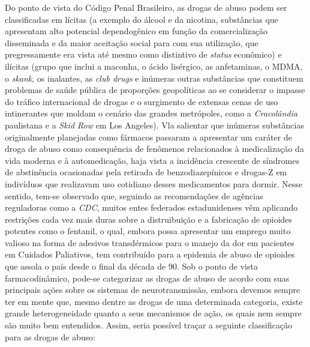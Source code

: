 \documentclass[
]{book}
\begin{document}
Do ponto de vista do Código Penal Brasileiro, as drogas de abuso podem ser classificadas em lícitas (a exemplo do álcool e da nicotina, substâncias que apresentam alto potencial dependogênico em função da comercialização disseminada e da maior aceitação social para com sua utilização, que pregressamente era vista até mesmo como distintivo de \emph{status} econômico) e ilícitas (grupo que inclui a maconha, o ácido lisérgico, as anfetaminas, o MDMA, o \emph{skank}, os inalantes, as \emph{club drugs} e inúmeras outras substâncias que constituem problemas de saúde pública de proporções geopolíticas ao se considerar o impasse do tráfico internacional de drogas e o surgimento de extensas cenas de uso intinerantes que moldam o cenário das grandes metrópoles, como a \emph{Cracolândia} paulistana e a \emph{Skid Row} em Los Angeles). Vla salientar que inúmeras substâncias originalmente planejadas como fármacos passaram a apresentar um caráter de droga de abuso como consequência de fenômenos relacionados à medicalização da vida moderna e à automedicação, haja vista a incidência crescente de síndromes de abstinência ocasionadas pela retirada de benzodiazepínicos e drogas-Z em indivíduos que realizavam uso cotidiano desses medicamentos para dormir. Nesse sentido, tem-se observado que, seguindo as recomendações de agências reguladoras como a \emph{CDC}, muitos entes federados estadunidenses vêm aplicando restrições cada vez mais duras sobre a distruibuição e a fabricação de opioides potentes como o fentanil, o qual, embora possa apresentar um emprego muito valioso na forma de adesivos transdérmicos para o manejo da dor em pacientes em Cuidados Paliativos, tem contribuído para a epidemia de abuso de opioides que assola o país desde o final da década de 90. Sob o ponto de vista farmacodinâmico, pode-se categorizar as drogas de abuso de acordo com suas principais ações sobre os sistemas de neurotransmissão, embora devemos sempre ter em mente que, mesmo dentre as drogas de uma determinada categoria, existe grande heterogeneidade quanto a seus mecanismos de ação, os quais nem sempre são muito bem entendidos. Assim, seria possível traçar a seguinte classificação para as drogas de abuso:
\end{document}
